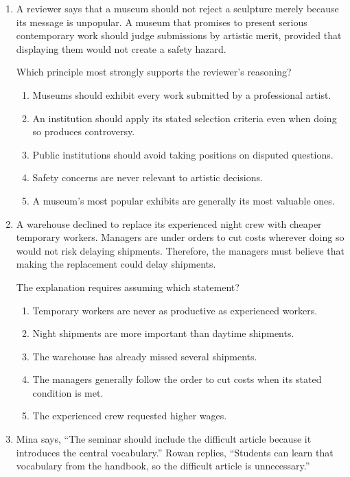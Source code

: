 \begin{enumerate}

\item A reviewer says that a museum should not reject a sculpture merely because its message is unpopular. A museum that promises to present serious contemporary work should judge submissions by artistic merit, provided that displaying them would not create a safety hazard.

Which principle most strongly supports the reviewer's reasoning?
\begin{enumerate}
\item[(A)] Museums should exhibit every work submitted by a professional artist.
\item[(B)] An institution should apply its stated selection criteria even when doing so produces controversy.
\item[(C)] Public institutions should avoid taking positions on disputed questions.
\item[(D)] Safety concerns are never relevant to artistic decisions.
\item[(E)] A museum's most popular exhibits are generally its most valuable ones.
\end{enumerate}

\item A warehouse declined to replace its experienced night crew with cheaper temporary workers. Managers are under orders to cut costs wherever doing so would not risk delaying shipments. Therefore, the managers must believe that making the replacement could delay shipments.

The explanation requires assuming which statement?
\begin{enumerate}
\item[(A)] Temporary workers are never as productive as experienced workers.
\item[(B)] Night shipments are more important than daytime shipments.
\item[(C)] The warehouse has already missed several shipments.
\item[(D)] The managers generally follow the order to cut costs when its stated condition is met.
\item[(E)] The experienced crew requested higher wages.
\end{enumerate}

\item Mina says, ``The seminar should include the difficult article because it introduces the central vocabulary.'' Rowan replies, ``Students can learn that vocabulary from the handbook, so the difficult article is unnecessary.''


\end{enumerate}

